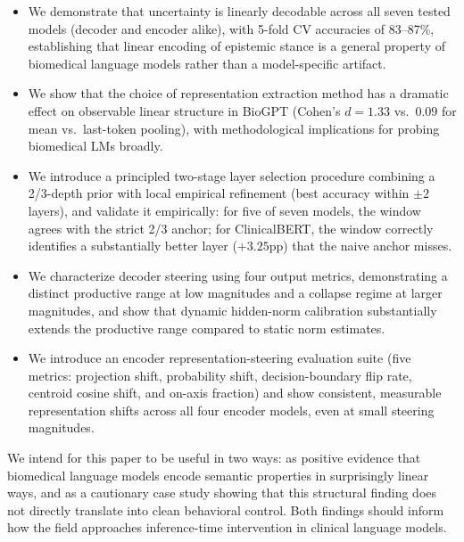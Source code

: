 \documentclass[11pt,a4paper]{article}
\begin{document}
\begin{itemize}
\item We demonstrate that uncertainty is linearly decodable across all
  seven tested models (decoder and encoder alike), with 5-fold CV
  accuracies of 83--87\%, establishing that linear encoding of epistemic
  stance is a general property of biomedical language models rather than
  a model-specific artifact.

\item We show that the choice of representation extraction method has a
  dramatic effect on observable linear structure in BioGPT (Cohen's
  $d = 1.33$ vs.\ $0.09$ for mean vs.\ last-token pooling), with
  methodological implications for probing biomedical LMs broadly.

\item We introduce a principled two-stage layer selection procedure
  combining a 2/3-depth prior with local empirical refinement (best
  accuracy within $\pm 2$ layers), and validate it empirically: for five
  of seven models, the window agrees with the strict 2/3 anchor; for
  ClinicalBERT, the window correctly identifies a substantially better
  layer ($+3.25$pp) that the naive anchor misses.

\item We characterize decoder steering using four output metrics,
  demonstrating a distinct productive range at low magnitudes and a
  collapse regime at larger magnitudes, and show that dynamic hidden-norm
  calibration substantially extends the productive range compared to
  static norm estimates.

\item We introduce an encoder representation-steering evaluation suite
  (five metrics: projection shift, probability shift, decision-boundary
  flip rate, centroid cosine shift, and on-axis fraction) and show
  consistent, measurable representation shifts across all four encoder
  models, even at small steering magnitudes.
\end{itemize}

We intend for this paper to be useful in two ways: as positive evidence
that biomedical language models encode semantic properties in
surprisingly linear ways, and as a cautionary case study showing that
this structural finding does not directly translate into clean behavioral
control. Both findings should inform how the field approaches
inference-time intervention in clinical language models.

\end{document}
